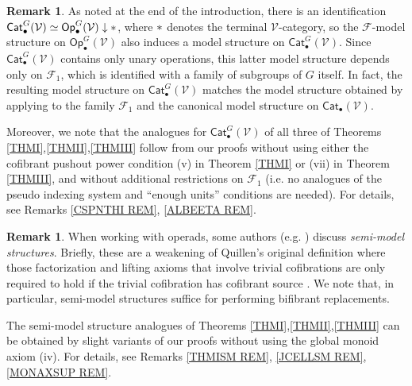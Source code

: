 \documentclass[a4paper,10pt
,draft
]{article}%
\numberwithin{equation}{section}
\numberwithin{figure}{section}
\theoremstyle{definition} %
\newtheorem{remark}[equation]{Remark}%
\newcommand{\Cat}{\mathsf{Cat}}
\newcommand{\Op}{\mathsf{Op}}%
\newcommand{\F}{\ensuremath{\mathcal F}}
\newcommand{\V}{\ensuremath{\mathcal V}}
\newcommand{\1}{\ensuremath{\mathbbm 1}}%
\begin{document}
\begin{remark}\label{RESTTOCATS REM}
	As noted at the end of the introduction, 
	there is an identification
	$\Cat_\bullet^G(\V) \simeq \Op_\bullet^G(\V) \downarrow \**$,
	where $\**$ denotes the terminal $\V$-category,
	so the $\F$-model structure on $\Op_\bullet^G(\V)$
	also induces a model structure on $\Cat_\bullet^G(\V)$.
	Since $\Cat_\bullet^G(\V)$ contains only unary operations,
	this latter model structure depends only on $\F_1$,
	which is identified with a family of subgroups of $G$ itself.
	In fact, the resulting model structure on 
	$\Cat_\bullet^G(\V)$ matches the model structure 
	obtained by applying \cite{Ste16}
	to the family $\F_1$ and the canonical model structure on
	$\Cat_\bullet(\V)$.

	Moreover, we note that the analogues for $\Cat_\bullet^G(\V)$
	of all three of Theorems \ref{THMI},\ref{THMII},\ref{THMIII}
	follow from our proofs without using either
	the cofibrant pushout power condition (v)
	in Theorem \ref{THMI}
	or (vii) in Theorem \ref{THMIII},
	and without additional restrictions on $\F_1$
	(i.e. no analogues of the  pseudo indexing system and ``enough units'' conditions are needed).
	For details, see Remarks \ref{CSPNTHI REM}, \ref{ALBEETA REM}.
\end{remark}



\begin{remark}\label{SEMI_REM}
	When working with operads, some authors (e.g. \cite{Spi,Whi17,WY18})
	discuss \emph{semi-model structures}.
	Briefly, these are a weakening of Quillen's original definition
	where those factorization and lifting axioms
	that involve trivial cofibrations
	are only required to hold if the trivial cofibration 
	has cofibrant source \cite[\S 2.2]{WY18}.
	We note that, in particular, semi-model structures suffice for 
	performing %
	bifibrant replacements.
        
	The semi-model structure analogues of 
	Theorems \ref{THMI},\ref{THMII},\ref{THMIII}
	can be obtained by slight variants of our proofs
	without using the global monoid axiom (iv).
	For details, see Remarks \ref{THMISM REM}, 
	\ref{JCELLSM REM}, \ref{MONAXSUP REM}.
\end{remark}
\end{document}
